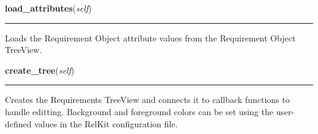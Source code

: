     \label{reliafree:requirement:Requirement:load_attributes}

    \vspace{0.5ex}

\hspace{.8\funcindent}\begin{boxedminipage}{\funcwidth}

    \raggedright \textbf{load\_attributes}(\textit{self})

    \vspace{-1.5ex}

    \rule{\textwidth}{0.5\fboxrule}
\setlength{\parskip}{2ex}
    Loads the Requirement Object attribute values from the Requirement 
    Object TreeView.

\setlength{\parskip}{1ex}
    \end{boxedminipage}

    \label{reliafree:requirement:Requirement:create_tree}

    \vspace{0.5ex}

\hspace{.8\funcindent}\begin{boxedminipage}{\funcwidth}

    \raggedright \textbf{create\_tree}(\textit{self})

    \vspace{-1.5ex}

    \rule{\textwidth}{0.5\fboxrule}
\setlength{\parskip}{2ex}
    Creates the Requirements TreeView and connects it to callback functions
    to handle editting.  Background and foreground colors can be set using 
    the user-defined values in the RelKit configuration file.

\setlength{\parskip}{1ex}
    \end{boxedminipage}

    \label{reliafree:requirement:Requirement:load_tree}

